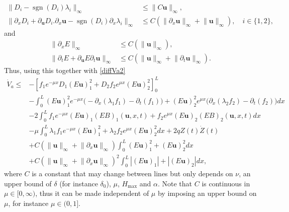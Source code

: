 \documentclass[11pt]{article}
\numberwithin{equation}{section}
\DeclareMathOperator{\sgn}{sgn}
\theoremstyle{definition}
\begin{document}
\begin{align*}
\lVert D_{i}-\sgn(D_{i})\lambda_{i}\rVert_{\infty}&\leq \lVert C\boldsymbol{u}\rVert_{\infty},
\\
\lVert\partial_{x}D_{i}+\partial_{\boldsymbol{u}}D_{i}.\partial_{x}\boldsymbol{u}-\sgn(D_{i})\partial_{x}\lambda_{i}\rVert_{\infty}&\leq C(\lVert \partial_{x}\boldsymbol{u}\rVert_{\infty}+\lVert \boldsymbol{u}\rVert_{\infty}),\quad i\in\{1,2\},
\end{align*}
and
\begin{align*}
\lVert\partial_{x}E\rVert_{\infty}&\leq C(\lVert \boldsymbol{u}\rVert_{\infty}),\\
\lVert\partial_{t}E+\partial_{\boldsymbol{u}}E\partial_{t}\boldsymbol{u}\rVert_{\infty}&\leq C(\lVert \boldsymbol{u}\rVert_{\infty}+\lVert \partial_{t} \boldsymbol{u}\rVert_{\infty}).
\end{align*}
Thus, using this together with \eqref{diffVa2}
\begin{equation*}
\begin{split}
\dot V_{a}\leq& -\left[f_{1}e^{-\mu x}D_{1}(E\boldsymbol{u})_{1}^{2}+D_{2}f_{2}e^{\mu x}(E\boldsymbol{u})_{2}^{2}\right]_{0}^{L}\\
&-\int_{0}^{L}(E\boldsymbol{u})_{1}^{2}e^{-\mu x}\bigl(-\partial_{x}(\lambda_{1}f_{1})-\partial_{t}(f_{1})\bigr)+(E\boldsymbol{u})_{2}^{2}e^{\mu x}\bigl(\partial_{x}(\lambda_{2}f_{2})-\partial_{t}(f_{2})\bigr)dx\\
&-2\int_{0}^{L}f_{1}e^{-\mu x}(E\boldsymbol{u})_{1}(EB)_{1}(\boldsymbol{u},x,t)+f_{2}e^{\mu x}(E\boldsymbol{u})_{2}(EB)_{2}(\boldsymbol{u},x,t)dx\\
&-\mu\int_{0}^{L}\lambda_{1}f_{1}e^{-\mu x}(E\boldsymbol{u})_{1}^{2}+\lambda_{2}f_{2}e^{\mu x}(E\boldsymbol{u})_{2}^{2}dx
+2qZ(t)\dot Z(t)\\
&+C\left(\lVert \boldsymbol{u}\rVert_{\infty}+\lVert \partial_{x} \boldsymbol{u}\rVert_{\infty}\right)\int_{0}^{L}(E\boldsymbol{u})_{1}^{2}+(E\boldsymbol{u})_{2}^{2} dx\\
&+C\left(\lVert \boldsymbol{u}\rVert_{\infty}+\lVert \partial_{x} \boldsymbol{u}\rVert_{\infty}\right)^{2}\int_{0}^{L}|(E\boldsymbol{u})_{1}|+|(E\boldsymbol{u})_{2}|dx,
\end{split}
\end{equation*}
where $C$ is a constant that may change between lines but
only depends on $\nu$, an upper bound of $\delta$ (for instance $\delta_{0}$), $\mu$, $H_{\max}$ and $\alpha$. Note that $C$ is continuous in $\mu\in[0,\infty)$, thus it can be made independent of $\mu$ by imposing an upper bound on $\mu$, for instance $\mu\in(0,1]$.
\end{document}
